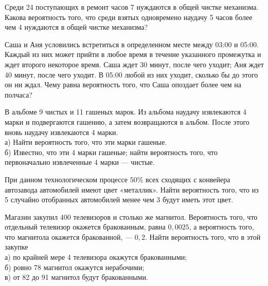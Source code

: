 \newpage\setcounter{zad}{0}



\begin{zkrW}{20}\noindent 
	Среди 24 поступающих в ремонт часов 7 нуждаются в общей чистке механизма. Какова вероятность того, что среди взятых одновремено наудачу 5 часов более чем 4 нуждаются в общей чистке механизма?
 
\end{zkrW}

\begin{zkrW}{20}\noindent 
	Саша и Аня условились встретиться в определенном месте между 03:00 и 05:00. Каждый из них может прийти в любое время в течение указанного промежутка и ждет второго некоторое время. Саша ждет 30 минут, после чего уходит; Аня ждет 40 минут, после чего уходит. В 05:00 любой из них уходит, сколько бы до этого он ни ждал. Чему равна вероятность того, что Саша опоздает более чем на полчаса?
 
\end{zkrW}

\begin{zkrW}{20}\noindent 
	В альбоме 9 чистых и 11 гашеных марок. Из альбома наудачу извлекаются 4 марки и подвергаются гашению, а затем возвращаются в альбом. После этого вновь наудачу извлекаются 4 марки. \\ \indent а) Найти вероятность того, что эти марки гашеные. \\ \indent б) Известно, что эти 4 марки гашеные; найти вероятность того, что первоначально извлеченные 4 марки --- чистые.
 
\end{zkrW}

\begin{zkrW}{20}\noindent 
	При данном технологическом процессе $50\%$ всех сходящих с конвейера автозавода автомобилей имеют цвет «металлик». Найти вероятность того, что из 5 случайно отобранных автомобилей менее чем 3 будут иметь этот цвет.
 
\end{zkrW}

\begin{zkrW}{20}\noindent 
	Магазин закупил 400 телевизоров и столько же магнитол. Вероятность того, что отдельный телевизор окажется бракованным, равна $0{,}0025$, а вероятность того, что магнитола окажется бракованной, --- $0{,}2$. Найти вероятность того, что в этой закупке \\ \indent а) по крайней мере 4 телевизора окажутся бракованными; \\ \indent б) ровно 78 магнитол окажутся нерабочими; \\ \indent в) от 82 до 91 магнитол будут бракованными.
 
\end{zkrW}

